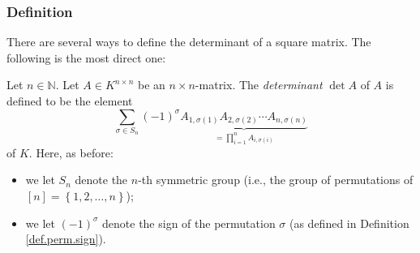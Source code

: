 \subsubsection{Definition}

There are several ways to define the determinant of a square matrix. The
following is the most direct one:

\begin{definition}
\label{def.det.det}Let $n\in\mathbb{N}$. Let $A\in K^{n\times n}$ be an
$n\times n$-matrix. The \emph{determinant} $\det A$ of $A$ is defined to be
the element%
\[
\sum_{\sigma\in S_{n}}\left(  -1\right)  ^{\sigma}\underbrace{A_{1,\sigma
\left(  1\right)  }A_{2,\sigma\left(  2\right)  }\cdots A_{n,\sigma\left(
n\right)  }}_{=\prod\limits_{i=1}^{n}A_{i,\sigma\left(  i\right)  }}%
\]
of $K$. Here, as before:

\begin{itemize}
\item we let $S_{n}$ denote the $n$-th symmetric group (i.e., the group of
permutations of $\left[  n\right]  =\left\{  1,2,\ldots,n\right\}  $);

\item we let $\left(  -1\right)  ^{\sigma}$ denote the sign of the permutation
$\sigma$ (as defined in Definition \ref{def.perm.sign}).
\end{itemize}
\end{definition}

